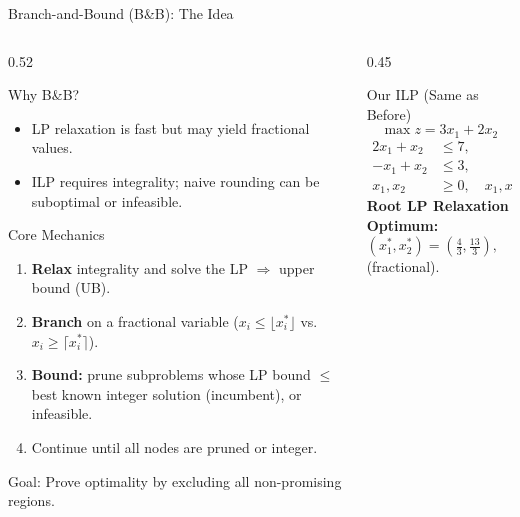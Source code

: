 \documentclass[aspectratio=169]{beamer}
\begin{document}
\begin{frame}{Branch-and-Bound (B\&B): The Idea}
\vspace{-0.4em}
\begin{columns}[T]
  \begin{column}{0.52\textwidth}
    \begin{block}{Why B\&B?}
      \footnotesize
      \begin{itemize}
        \item LP relaxation is fast but may yield fractional values.
        \item ILP requires integrality; naive rounding can be suboptimal or infeasible.
      \end{itemize}
    \end{block}
    \vspace{-0.5em}
    \begin{block}{Core Mechanics}
      \footnotesize
      \begin{enumerate}
        \item \textbf{Relax} integrality and solve the LP $\Rightarrow$ upper bound (UB).
        \item \textbf{Branch} on a fractional variable ($x_i \le \lfloor x_i^*\rfloor$ vs. $x_i \ge \lceil x_i^*\rceil$).
        \item \textbf{Bound:} prune subproblems whose LP bound $\le$ best known integer solution (incumbent), or infeasible.
        \item Continue until all nodes are pruned or integer.
      \end{enumerate}
    \end{block}
    \vspace{-0.2em}
    \footnotesize
    \alert{Goal:} Prove optimality by excluding all non-promising regions.
  \end{column}
  \begin{column}{0.45\textwidth}
    \begin{block}{Our ILP (Same as Before)}
      \footnotesize
      \[
        \max z = 3x_1 + 2x_2
      \]
      \vspace{-0.8em}
      \[
        \begin{aligned}
          2x_1 + x_2 &\le 7,\\
          -x_1 + x_2 &\le 3,\\
          x_1, x_2 &\ge 0, \quad x_1,x_2 \in \mathbb{Z}.
        \end{aligned}
      \]
      \textbf{Root LP Relaxation Optimum:}\\
      $(x_1^*,x_2^*)=\left(\tfrac{4}{3},\tfrac{13}{3}\right), \quad z^* \approx 12.67$ (fractional).
    \end{block}
  \end{column}
\end{columns}
\end{frame}
\end{document}
